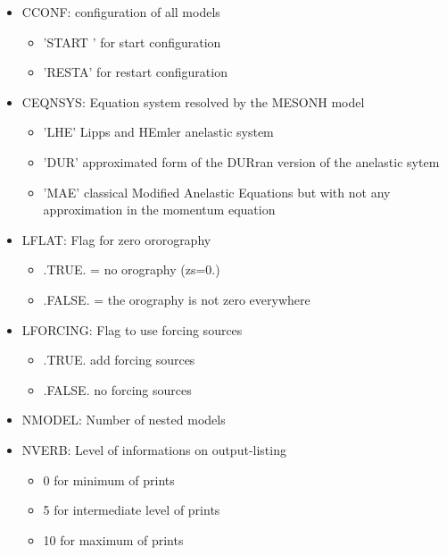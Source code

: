 \begin{itemize}

\item
CCONF:  configuration of all  models

\begin{itemize}
\item                       'START  ' for start configuration
\item                       'RESTA'   for restart configuration
\end{itemize}

\item
CEQNSYS: Equation system resolved by the MESONH model

\begin{itemize}
\item 'LHE' Lipps and HEmler anelastic system
\item 'DUR' approximated form of the DURran version of the anelastic sytem
\item 'MAE' classical Modified Anelastic Equations but with not any approximation
in the momentum equation
\end{itemize}

\item
LFLAT:   Flag for zero ororography

\begin{itemize}
\item   .TRUE.  = no orography (zs=0.)
\item  .FALSE.  = the orography is not zero everywhere
\end{itemize}

\item
LFORCING: Flag to use forcing sources

\begin{itemize}
\item .TRUE. add forcing sources
\item .FALSE. no forcing sources
\end{itemize}


\item
NMODEL:  Number of nested models

\item
NVERB:  Level of informations on output-listing

\begin{itemize}
\item   0 for minimum of prints
\item   5 for intermediate level of prints
\item    10 for maximum of prints 
\end{itemize}


\end{itemize}
